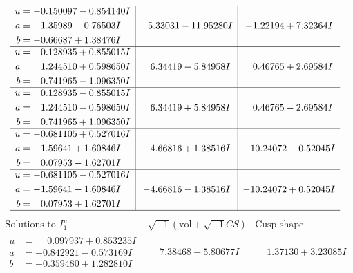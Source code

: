 \documentclass[1p]{elsarticle_modified}
\theoremstyle{definition}
\newcommand{\I}{\sqrt{-1}}
\begin{document}
$$\begin{array}{c|c|c}
\begin{aligned}
u &= -0.150097 - 0.854140 I \\
a &= -1.35989 - 0.76503 I \\
b &= -0.66687 + 1.38476 I\end{aligned}
 & \phantom{-}5.33031 - 11.95280 I & -1.22194 + 7.32364 I \\ \hline\begin{aligned}
u &= \phantom{-}0.128935 + 0.855015 I \\
a &= \phantom{-}1.244510 + 0.598650 I \\
b &= \phantom{-}0.741965 - 1.096350 I\end{aligned}
 & \phantom{-}6.34419 - 5.84958 I & \phantom{-}0.46765 + 2.69584 I \\ \hline\begin{aligned}
u &= \phantom{-}0.128935 - 0.855015 I \\
a &= \phantom{-}1.244510 - 0.598650 I \\
b &= \phantom{-}0.741965 + 1.096350 I\end{aligned}
 & \phantom{-}6.34419 + 5.84958 I & \phantom{-}0.46765 - 2.69584 I \\ \hline\begin{aligned}
u &= -0.681105 + 0.527016 I \\
a &= -1.59641 + 1.60846 I \\
b &= \phantom{-}0.07953 - 1.62701 I\end{aligned}
 & -4.66816 + 1.38516 I & -10.24072 - 0.52045 I \\ \hline\begin{aligned}
u &= -0.681105 - 0.527016 I \\
a &= -1.59641 - 1.60846 I \\
b &= \phantom{-}0.07953 + 1.62701 I\end{aligned}
 & -4.66816 - 1.38516 I & -10.24072 + 0.52045 I\\
 \hline 
 \end{array}$$\newpage$$\begin{array}{c|c|c}  
\text{Solutions to }I^u_{1}& \I (\text{vol} + \sqrt{-1}CS) & \text{Cusp shape}\\
 \hline 
\begin{aligned}
u &= \phantom{-}0.097937 + 0.853235 I \\
a &= -0.842921 - 0.573169 I \\
b &= -0.359480 + 1.282810 I\end{aligned}
 & \phantom{-}7.38468 - 5.80677 I & \phantom{-}1.37130 + 3.23085 I \\ \hline\begin{aligned}

\end{aligned}
\end{array}$$
\end{document}
